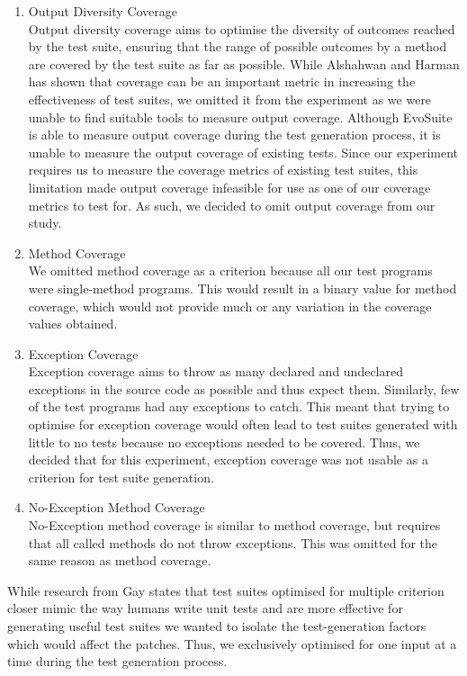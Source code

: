 \documentclass[titlepage]{article}
\begin{document}
\begin{enumerate}
	\item Output Diversity Coverage \\
Output diversity coverage aims to optimise the diversity of outcomes reached by the test suite, ensuring that the range of possible outcomes by a method are covered by the test suite as far as possible. While Alshahwan and Harman \cite{outputdiversity} has shown that coverage can be an important metric in increasing the effectiveness of test suites, we omitted it from the experiment as we were unable to find suitable tools to measure output coverage. Although EvoSuite is able to measure output coverage during the test generation process, it is unable to measure the output coverage of existing tests. Since our experiment requires us to measure the coverage metrics of existing test suites, this limitation made output coverage infeasible for use as one of our coverage metrics to test for. As such, we decided to omit output coverage from our study.

	\item Method Coverage \\
We omitted method coverage as a criterion because all our test programs were single-method programs. This would result in a binary value for method coverage, which would not provide much or any variation in the coverage values obtained.

	\item Exception Coverage \\
Exception coverage aims to throw as many declared and undeclared exceptions in the source code as possible and thus expect them.
Similarly, few of the test programs had any exceptions to catch. This meant that trying to optimise for exception coverage would often lead to test suites generated with little to no tests because no exceptions needed to be covered. Thus, we decided that for this experiment, exception coverage was not usable as a criterion for test suite generation.

	\item No-Exception Method Coverage \\
No-Exception method coverage is similar to method coverage, but requires that all called methods do not throw exceptions. This was omitted for the same reason as method coverage.

\end{enumerate}

While research from Gay \cite{coveragecombination} states that test suites optimised for multiple criterion closer mimic the way humans write unit tests and are more effective for generating useful test suites we wanted to isolate the test-generation factors which would affect the patches. Thus, we exclusively optimised for one input at a time during the test generation process.
\end{document}
